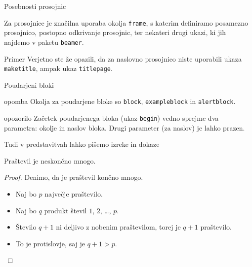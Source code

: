 \begin{frame}{Posebnosti prosojnic}

	Za prosojnice je značilna uporaba okolja \texttt{frame},
	s katerim definiramo posamezno prosojnico,\pause
	postopno odkrivanje prosojnic,\pause
	ter nekateri drugi ukazi, ki jih najdemo v paketu \texttt{beamer}.\pause
	\begin{exampleblock}{Primer}
		Verjetno ste že opazili, da za naslovno prosojnico niste uporabili
		ukaza \texttt{maketitle}, ampak ukaz \texttt{titlepage}.
	\end{exampleblock}
\end{frame}

\begin{frame}{Poudarjeni bloki}

		\begin{exampleblock}{opomba}
			Okolja za poudarjene bloke so \texttt{block}, \texttt{exampleblock} in \texttt{alertblock}.
		\end{exampleblock}

		\begin{alertblock}{opozorilo}
			Začetek poudarjenega bloka (ukaz \texttt{begin}) vedno sprejme 
			dva parametra: okolje in naslov bloka.
			Drugi parameter (za naslov) je lahko prazen. 	
		\end{alertblock}
\end{frame}

\begin{frame}{Tudi v predstavitvah lahko pišemo izreke in dokaze}

	\begin{izrek}
	   Praštevil je neskončno mnogo.
	\end{izrek}
	\begin{proof}
	   Denimo, da je praštevil končno mnogo.
	   \begin{itemize}[<+->]
		  \item Naj bo $p$ \alert<4>{največje} praštevilo.
		  \item Naj bo $q$ produkt števil $1$, $2$, \ldots, $p$.
		  \item Število $q+1$ ni deljivo z nobenim praštevilom, torej je $q+1$ praštevilo.
		  \item To je protislovje, saj je $q+1>p$. \qedhere
	   \end{itemize}
	\end{proof}
\end{frame}
 
